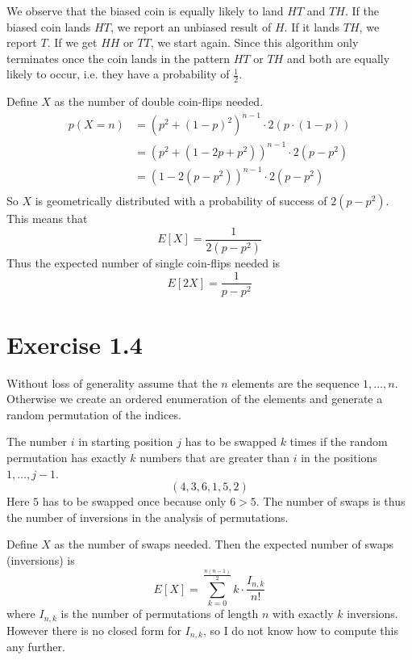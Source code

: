 \documentclass[10pt,a4paper]{article}
\begin{document}
We observe that the biased coin is equally likely to land $HT$ and $TH$.
If the biased coin lands $HT$, we report an unbiased result of $H$.
If it lands $TH$, we report $T$.
If we get $HH$ or $TT$, we start again.
Since this algorithm only terminates once the coin lands in the pattern $HT$ or $TH$ and both are equally likely to occur, i.e. they have a probability of $\frac{1}{2}$.

Define $X$ as the number of double coin-flips needed.
\begin{align*}
  p(X = n) & = (p^{2} + (1 - p)^{2})^{n - 1} \cdot 2(p \cdot (1 - p))\\
           & = (p^{2} + (1 - 2p + p^{2}))^{n - 1} \cdot 2(p - p^{2})\\
           & = (1 - 2(p - p^{2}))^{n - 1} \cdot 2(p - p^{2})\\
\end{align*}
So $X$ is geometrically distributed with a probability of success of $2(p - p^{2})$.
This means that
\begin{equation*}
  E[X] = \frac{1}{2(p - p^{2})}
\end{equation*}
Thus the expected number of single coin-flips needed is
\begin{equation*}
  E[2X] = \frac{1}{p - p^{2}}
\end{equation*}

\section*{Exercise 1.4}

Without loss of generality assume that the $n$ elements are the sequence $1, \dots, n$.
Otherwise we create an ordered enumeration of the elements and generate a random permutation of the indices.

The number $i$ in starting position $j$ has to be swapped $k$ times if the random permutation has exactly $k$ numbers that are greater than $i$ in the positions $1, \dots, j - 1$.
\begin{equation*}
  (4, 3, 6, 1, 5, 2)
\end{equation*}
Here $5$ has to be swapped once because only $6 > 5$.
The number of swaps is thus the number of inversions in the analysis of permutations.

Define $X$ as the number of swaps needed.
Then the expected number of swaps (inversions) is
\begin{equation*}
  E[X] = \sum_{k = 0}^{\frac{n(n - 1)}{2}} k \cdot \frac{I_{n,k}}{n!}
\end{equation*}
where $I_{n,k}$ is the number of permutations of length $n$ with exactly $k$ inversions.
However there is no closed form for $I_{n,k}$, so I do not know how to compute this any further.
\end{document}
